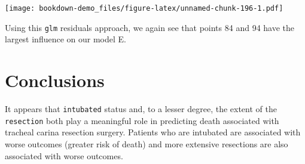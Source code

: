 \documentclass[]{book}
\theoremstyle{definition}
\theoremstyle{definition}
\theoremstyle{definition}
\theoremstyle{remark}
\begin{document}
\texttt{[image: bookdown-demo\_files/figure-latex/unnamed-chunk-196-1.pdf]}

Using this \texttt{glm} residuals approach, we again see that points 84
and 94 have the largest influence on our model E.

\section{Conclusions}\label{conclusions}

It appears that \texttt{intubated} status and, to a lesser degree, the
extent of the \texttt{resection} both play a meaningful role in
predicting death associated with tracheal carina resection surgery.
Patients who are intubated are associated with worse outcomes (greater
risk of death) and more extensive resections are also associated with
worse outcomes.


\end{document}
